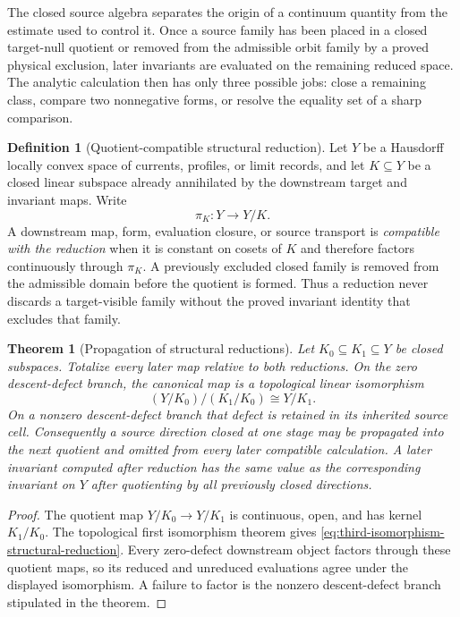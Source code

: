 \documentclass[11pt]{article}
\numberwithin{section}{part}
\theoremstyle{plain}
\newtheorem{theorem}{Theorem}[section]
\theoremstyle{definition}
\newtheorem{definition}[definition]{Definition}
\theoremstyle{remark}
\begin{document}
The closed source algebra separates the origin of a continuum quantity from
the estimate used to control it.  Once a source family has been placed in a
closed target-null quotient or removed from the admissible orbit family by a
proved physical exclusion, later invariants are evaluated on the remaining
reduced space.  The analytic calculation then has only three possible jobs:
close a remaining class, compare two nonnegative forms, or resolve the
equality set of a sharp comparison.

\begin{definition}[Quotient-compatible structural reduction]
\label{def:invariant-compatible-reduction}
Let \(Y\) be a Hausdorff locally convex space of currents, profiles, or
limit records, and let \(K\subseteq Y\) be a closed linear subspace already
annihilated by the downstream target and invariant maps.  Write
\[
 \pi_K:Y\longrightarrow Y/K.
\]
A downstream map, form, evaluation closure, or source transport is
\emph{compatible with the reduction} when it is constant on cosets of \(K\)
and therefore factors continuously through \(\pi_K\).  A previously excluded
closed family is removed from the admissible domain before the quotient is
formed.  Thus a reduction never discards a target-visible family without the
proved invariant identity that excludes that family.
\end{definition}

\begin{theorem}[Propagation of structural reductions]
\label{thm:structural-reduction-propagation}
Let \(K_0\subseteq K_1\subseteq Y\) be closed subspaces.  Totalize every
later map relative to both reductions.  On the zero descent-defect branch,
the canonical map is a topological linear isomorphism
\begin{equation}
 \label{eq:third-isomorphism-structural-reduction}
 (Y/K_0)/(K_1/K_0)\cong Y/K_1.
\end{equation}
On a nonzero descent-defect branch that defect is retained in its inherited
source cell.  Consequently a source direction closed at one stage may be propagated into
the next quotient and omitted from every later compatible calculation.  A
later invariant computed after reduction has the same value as the
corresponding invariant on \(Y\) after quotienting by all previously closed
directions.
\end{theorem}

\begin{proof}
The quotient map \(Y/K_0\to Y/K_1\) is continuous, open, and has kernel
\(K_1/K_0\).  The topological first isomorphism theorem gives
\eqref{eq:third-isomorphism-structural-reduction}.  Every zero-defect
downstream object factors through these quotient maps, so its reduced and
unreduced evaluations agree under the displayed isomorphism.  A failure to
factor is the nonzero descent-defect branch stipulated in the theorem.
\end{proof}
\end{document}
